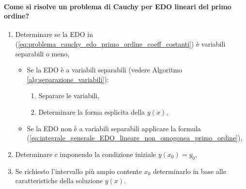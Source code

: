 \paragraph{Come si risolve un problema di Cauchy per EDO lineari del primo ordine?}
\begin{enumerate}
	\item Determinare se la EDO in (\ref{eq:problema_cauchy_edo_primo_ordine_coeff_costanti}) è variabili separabili o meno,
	
	\begin{itemize}
		\item Se la EDO è a variabili separabili (vedere Algoritmo \ref{alg:separazione_variabili}):
		\begin{enumerate}
			\item Separare le variabili,
			\item Determinare la forma esplicita della $y(x)$,
		\end{enumerate}
		\item Se la EDO non è a variabili separabili applicare la formula (\ref{eq:integrale_generale_EDO_lineare_non_omogonea_primo_ordine}),
	\end{itemize}
	
	\item Determinare $c$ imponendo la condizione iniziale $y(x_0)=y_0$,
	
	\item Se richiesto l'intervallo più ampio contente $x_0$ determinarlo in base alle caratteristiche della soluzione $y(x)$.
\end{enumerate}
